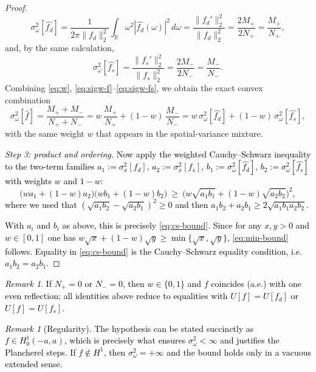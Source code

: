 \documentclass[preprint,hidelinks,authoryear]{elsarticle}
\theoremstyle{plain}
\theoremstyle{definition}
\theoremstyle{remark}
\newtheorem{remark}[theorem]{Remark}
\begin{document}
\begin{proof}
{\begin{equation}\label{eq:sigw-fd}
\sigma_\omega^2[\widehat{f_d}]
=\frac{1}{2\pi\|f_d\|_2^2}\int_{\mathbb R}\omega^2|\widehat{f_d}(\omega)|^2\,d\omega
=\frac{\|f_d'\|_2^2}{\|f_d\|_2^2}
=\frac{2M_+}{2N_+}
=\frac{M_+}{N_+},
\end{equation}
and, by the same calculation,
\begin{equation}\label{eq:sigw-fs}
\sigma_\omega^2[\widehat{f_s}]
=\frac{\|f_s'\|_2^2}{\|f_s\|_2^2}
=\frac{2M_-}{2N_-}
=\frac{M_-}{N_-}.
\end{equation}
Combining \eqref{eq:w}, \eqref{eq:sigw-f}–\eqref{eq:sigw-fs}, we obtain the exact convex combination
\begin{equation}\label{eq:sigw-weighted}
\sigma_\omega^2[\hat f]
=\frac{M_+ + M_-}{N_+ + N_-}
=w\,\frac{M_+}{N_+}+(1-w)\,\frac{M_-}{N_-}
=w\,\sigma_\omega^2[\widehat{f_d}]+(1-w)\,\sigma_\omega^2[\widehat{f_s}],
\end{equation}
with the same weight $w$ that appears in the spatial-variance mixture.}

\textcolor{black}{
\emph{Step 3: product and ordering.} Now apply the weighted Cauchy–Schwarz inequality to the two-term families
$a_1:=\sigma_x^2[f_d]$, $a_2:=\sigma_x^2[f_s]$, $b_1:=\sigma_\omega^2[\widehat{f_d}]$, $b_2:=\sigma_\omega^2[\widehat{f_s}]$ with weights $w$ and $1-w$:
$$
\big(w a_1+(1-w) a_2\big)\big(w b_1+(1-w) b_2\big)\ \ge\
\big(w\sqrt{a_1b_1}+(1-w)\sqrt{a_2b_2}\big)^2,
$$
where we used that $(\sqrt{a_1b_2}-\sqrt{a_2b_1})^2 \ge 0$ and then $a_1b_2+a_2b_1 \ge 2\sqrt{a_1b_1a_2b_2}$.}


\textcolor{black}{
With $a_i$ and $b_i$ as above, this is precisely \eqref{eq:cs-bound}. Since for any $x,y>0$ and $w\in[0,1]$ one has
$w\sqrt{x}+(1-w)\sqrt{y}\ge \min\{\sqrt{x},\sqrt{y}\}$, \eqref{eq:min-bound} follows. Equality in \eqref{eq:cs-bound} is the Cauchy–Schwarz equality condition, i.e. $a_1 b_2= a_2b_1$.}


\end{proof}
\textcolor{black}{
\begin{remark}
    If $N_+=0$ or $N_-=0$, then $w\in\{0,1\}$ and $f$ coincides (a.e.) with one even reflection; all identities above reduce to equalities with $U[f]=U[f_d]$ or $U[f]=U[f_s]$.
\end{remark}}
\textcolor{black}{
\begin{remark}[Regularity]
The hypothesis can be stated succinctly as $f\in H^1_0(-a,a)$, which is precisely what ensures $\sigma_\omega^2<\infty$ and justifies the Plancherel steps. If $f\notin H^1$, then $\sigma_\omega^2=+\infty$ and the bound holds only in a vacuous extended sense.
\end{remark}}
\end{document}
